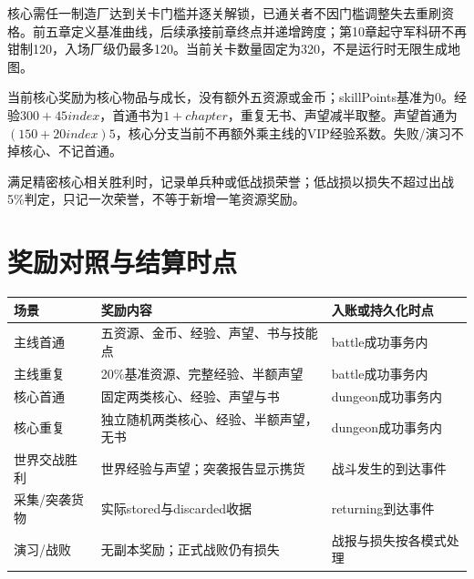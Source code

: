 核心需任一制造厂达到关卡门槛并逐关解锁，已通关者不因门槛调整失去重刷资格。前五章定义基准曲线，后续承接前章终点并递增跨度；第10章起守军科研不再钳制120，入场厂级仍最多120。当前关卡数量固定为320，不是运行时无限生成地图。

当前核心奖励为核心物品与成长，没有额外五资源或金币；skillPoints基准为0。经验\(300+45index\)，首通书为\(1+chapter\)，重复无书、声望减半取整。声望首通为\((150+20index)5\)，核心分支当前不再额外乘主线的VIP经验系数。失败/演习不掉核心、不记首通。

满足精密核心相关胜利时，记录单兵种或低战损荣誉；低战损以损失不超过出战5\%判定，只记一次荣誉，不等于新增一笔资源奖励。

\section{奖励对照与结算时点}
\begin{small}\begin{longtable}{@{}P{31mm}P{67mm}P{46mm}@{}}
\toprule 场景 & 奖励内容 & 入账或持久化时点\\\midrule\endhead
主线首通 & 五资源、金币、经验、声望、书与技能点 & battle成功事务内\\
主线重复 & 20\%基准资源、完整经验、半额声望 & battle成功事务内\\
核心首通 & 固定两类核心、经验、声望与书 & dungeon成功事务内\\
核心重复 & 独立随机两类核心、经验、半额声望，无书 & dungeon成功事务内\\
世界交战胜利 & 世界经验与声望；突袭报告显示携货 & 战斗发生的到达事件\\
采集/突袭货物 & 实际stored与discarded收据 & returning到达事件\\
演习/战败 & 无副本奖励；正式战败仍有损失 & 战报与损失按各模式处理\\
\bottomrule\end{longtable}\end{small}
